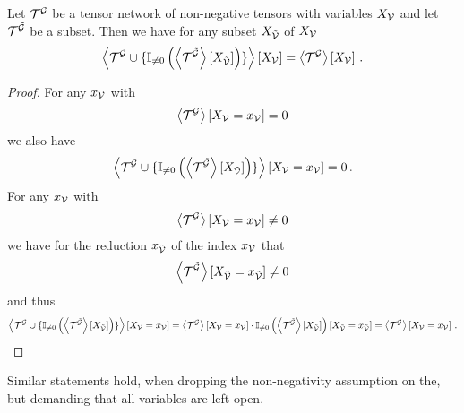\begin{theorem}\label{the:invarianceAddingSubcontractions}
	Let $\mathcal{T}^{\mathcal{G}}$ be a tensor network of non-negative tensors with variables $X_{\mathcal{V}}$ and let $\mathcal{T}^{\tilde{\mathcal{G}}}$ be a subset.
	Then we have for any subset $X_{\tilde{\mathcal{V}}}$ of $X_{\mathcal{V}}$
		\[ \left\langle \mathcal{T}^{\mathcal{G}} \cup\{
			\mathbb{I}_{\neq0}\left(
			\left\langle \mathcal{T}^{\tilde{\mathcal{G}}}\right\rangle \left[ X_{\tilde{\mathcal{V}}} \right]
			\right)
		\}\right\rangle \left[ X_{\mathcal{V}} \right]
		= \left\langle \mathcal{T}^{\mathcal{G}}\right\rangle \left[ X_{\mathcal{V}} \right]
		\, . \]
\end{theorem}
\begin{proof}
	For any $x_{\mathcal{V}}$ with
		\[ \left\langle \mathcal{T}^{\mathcal{G}}\right\rangle \left[ X_{\mathcal{V}}=x_{\mathcal{V}} \right] = 0 \]
	we also have
		\[ \left\langle \mathcal{T}^{\mathcal{G}} \cup\{
			\mathbb{I}_{\neq0}\left(
			\left\langle \mathcal{T}^{\tilde{\mathcal{G}}}\right\rangle \left[ X_{\tilde{\mathcal{V}}} \right]
			\right)
		\}\right\rangle \left[ X_{\mathcal{V}}=x_{\mathcal{V}} \right] = 0 \, . \]
	For any $x_{\mathcal{V}}$ with
		\[ \left\langle \mathcal{T}^{\mathcal{G}}\right\rangle \left[ X_{\mathcal{V}}=x_{\mathcal{V}} \right] \neq 0 \]
	we have for the reduction $x_{\tilde{\mathcal{V}}}$ of the index $x_{\mathcal{V}}$ that
		\[  \left\langle \mathcal{T}^{\tilde{\mathcal{G}}}\right\rangle \left[ X_{\tilde{\mathcal{V}}}=x_{\tilde{\mathcal{V}}} \right] \neq 0 \]
	and thus
	\begin{align*}
		\left\langle \mathcal{T}^{\mathcal{G}} \cup\{
			\mathbb{I}_{\neq0}\left(
			\left\langle \mathcal{T}^{\tilde{\mathcal{G}}}\right\rangle \left[ X_{\tilde{\mathcal{V}}} \right]
			\right)
		\}\right\rangle \left[ X_{\mathcal{V}}=x_{\mathcal{V}} \right]
		= \left\langle \mathcal{T}^{\mathcal{G}}\right\rangle \left[ X_{\mathcal{V}}=x_{\mathcal{V}} \right] \cdot \mathbb{I}_{\neq0}\left(
			\left\langle \mathcal{T}^{\tilde{\mathcal{G}}}\right\rangle \left[ X_{\tilde{\mathcal{V}}} \right]
			\right)[X_{\tilde{\mathcal{V}}}=x_{\tilde{\mathcal{V}}}]
		= \left\langle \mathcal{T}^{\mathcal{G}}\right\rangle \left[ X_{\mathcal{V}}=x_{\mathcal{V}} \right] \, .
	\end{align*}
\end{proof}





\begin{remark}
	Similar statements hold, when dropping the non-negativity assumption on the, but demanding that all variables are left open.
\end{remark}







